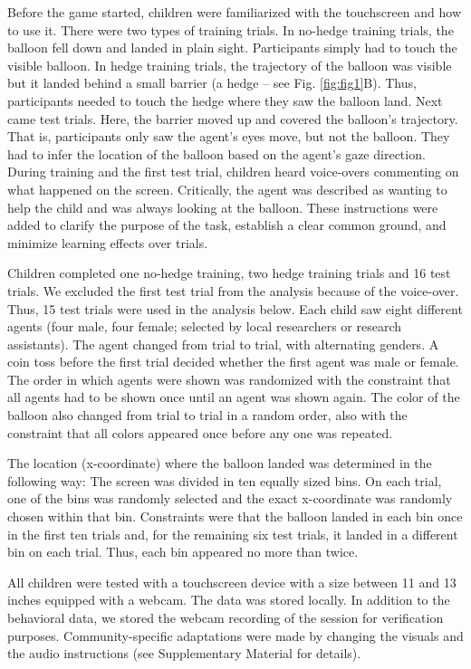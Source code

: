 \documentclass[
  man,floatsintext]{apa7}
\begin{document}
Before the game started, children were familiarized with the touchscreen and how to use it. There were two types of training trials. In no-hedge training trials, the balloon fell down and landed in plain sight. Participants simply had to touch the visible balloon. In hedge training trials, the trajectory of the balloon was visible but it landed behind a small barrier (a hedge -- see Fig. \ref{fig:fig1}B). Thus, participants needed to touch the hedge where they saw the balloon land. Next came test trials. Here, the barrier moved up and covered the balloon's trajectory. That is, participants only saw the agent's eyes move, but not the balloon. They had to infer the location of the balloon based on the agent's gaze direction. During training and the first test trial, children heard voice-overs commenting on what happened on the screen. Critically, the agent was described as wanting to help the child and was always looking at the balloon. These instructions were added to clarify the purpose of the task, establish a clear common ground, and minimize learning effects over trials.

Children completed one no-hedge training, two hedge training trials and 16 test trials. We excluded the first test trial from the analysis because of the voice-over. Thus, 15 test trials were used in the analysis below. Each child saw eight different agents (four male, four female; selected by local researchers or research assistants). The agent changed from trial to trial, with alternating genders. A coin toss before the first trial decided whether the first agent was male or female. The order in which agents were shown was randomized with the constraint that all agents had to be shown once until an agent was shown again. The color of the balloon also changed from trial to trial in a random order, also with the constraint that all colors appeared once before any one was repeated.

The location (x-coordinate) where the balloon landed was determined in the following way: The screen was divided in ten equally sized bins. On each trial, one of the bins was randomly selected and the exact x-coordinate was randomly chosen within that bin. Constraints were that the balloon landed in each bin once in the first ten trials and, for the remaining six test trials, it landed in a different bin on each trial. Thus, each bin appeared no more than twice.

All children were tested with a touchscreen device with a size between 11 and 13 inches equipped with a webcam. The data was stored locally. In addition to the behavioral data, we stored the webcam recording of the session for verification purposes. Community-specific adaptations were made by changing the visuals and the audio instructions (see Supplementary Material for details).
\end{document}
